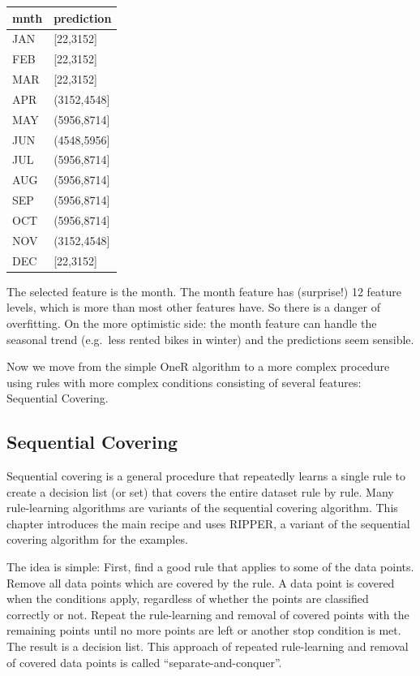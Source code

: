 \documentclass[
  12pt,
]{krantz}
\begin{document}
\begin{tabular}{l|l}
\hline
mnth & prediction\\
\hline
JAN & [22,3152]\\
\hline
FEB & [22,3152]\\
\hline
MAR & [22,3152]\\
\hline
APR & (3152,4548]\\
\hline
MAY & (5956,8714]\\
\hline
JUN & (4548,5956]\\
\hline
JUL & (5956,8714]\\
\hline
AUG & (5956,8714]\\
\hline
SEP & (5956,8714]\\
\hline
OCT & (5956,8714]\\
\hline
NOV & (3152,4548]\\
\hline
DEC & [22,3152]\\
\hline
\end{tabular}

The selected feature is the month.
The month feature has (surprise!) 12 feature levels, which is more than most other features have.
So there is a danger of overfitting.
On the more optimistic side: the month feature can handle the seasonal trend (e.g.~less rented bikes in winter) and the predictions seem sensible.

Now we move from the simple OneR algorithm to a more complex procedure using rules with more complex conditions consisting of several features: Sequential Covering.

\hypertarget{sequential-covering}{%
\subsection{Sequential Covering}\label{sequential-covering}}

Sequential covering is a general procedure that repeatedly learns a single rule to create a decision list (or set) that covers the entire dataset rule by rule.
Many rule-learning algorithms are variants of the sequential covering algorithm.
This chapter introduces the main recipe and uses RIPPER, a variant of the sequential covering algorithm for the examples.

The idea is simple:
First, find a good rule that applies to some of the data points.
Remove all data points which are covered by the rule.
A data point is covered when the conditions apply, regardless of whether the points are classified correctly or not.
Repeat the rule-learning and removal of covered points with the remaining points until no more points are left or another stop condition is met.
The result is a decision list.
This approach of repeated rule-learning and removal of covered data points is called ``separate-and-conquer''.
\end{document}
